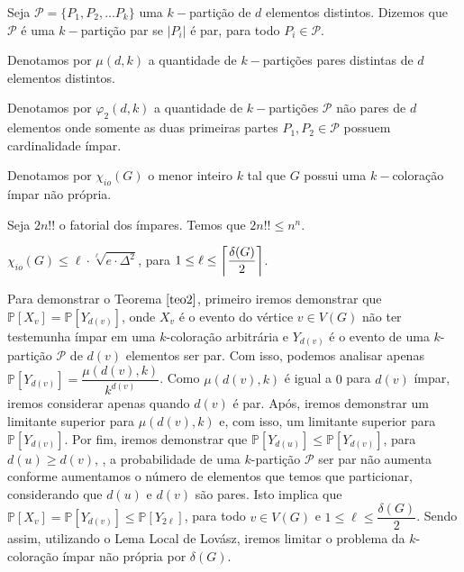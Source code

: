 \documentclass[12pt]{article}
\begin{document}

{
 
\begin{defi}
	\label{defi1}
	Seja $\mathcal{P} = \{P_1, P_2, \ldots P_k \}$ uma $k-$partição de $d$ elementos distintos. Dizemos que $\mathcal{P}$ é uma $k-$partição par se $|P_i|$ é par, para todo $P_i \in \mathcal{P}$.
\end{defi} \newbegin
 

\begin{defi}
	\label{defi2}
	Denotamos por $\mu(d, k)$ a quantidade de $k-$partições pares distintas de $d$ elementos distintos.
\end{defi} \newbegin

\begin{defi}
	\label{def4}
	Denotamos por $\varphi_2(d, k)$ a quantidade de $k-$partições $\mathcal{P}$ não pares de $d$ elementos onde somente as duas primeiras partes $P_1, P_2 \in \mathcal{P}$ possuem cardinalidade ímpar. 
\end{defi} \newbegin

\begin{defi}
	\label{def5}
	Denotamos por $\chi_{io}(G)$ o menor inteiro $k$ tal que  $G$ possui uma $k-$coloração ímpar não própria. 
\end{defi} \newbegin

\begin{prop}
	\label{prop3}
	Seja $2n!!$ o fatorial dos ímpares. Temos que $2n!! \leq n^n$.
\end{prop} \newbegin
 
\begin{teo}
	\label{teo2} 
	$\chi_{io}(G) \leq \ell {\cdot} \sqrt[\ell]{e {\cdot} \Delta^2}$, para $1 \leq \ell \leq \left \lceil \dfrac{\delta(G)}{2} \right \rceil$. 
\end{teo}   

 Para demonstrar o Teorema $\ref{teo2}$, primeiro iremos demonstrar que $\mathds{P}[X_v] = \mathds{P}[Y_{d(v)}]$, onde $X_v$ é o evento do vértice $v \in V(G)$ não ter testemunha ímpar em uma $k$-coloração arbitrária e $Y_{d(v)}$ é o evento de uma $k$-partição $\mathcal{P}$ de $d(v)$ elementos ser par. Com isso, podemos analisar apenas $\mathds{P}[Y_{d(v)}] = \dfrac{\mu(d(v), k)}{k^{d(v)}}$. Como $\mu(d(v), k)$ é igual a $0$ para $d(v)$ ímpar, iremos considerar apenas quando $d(v)$ é par. Após, iremos demonstrar um limitante superior para $\mu(d(v), k)$ e, com isso, um limitante superior para $\mathds{P}[Y_{d(v)}]$. Por fim, iremos demonstrar que $\mathds{P}[Y_{d(u)}] \leq \mathds{P}[Y_{d(v)}]$, para $d(u) \geq d(v)$, \ie, a probabilidade de uma $k$-partição $\mathcal{P}$ ser par não aumenta conforme aumentamos o número de elementos que temos que particionar, considerando que $d(u)$ e $d(v)$ são pares. Isto implica que $\mathds{P}[X_v] = \mathds{P}[Y_{d(v)}] \leq \mathds{P}[Y_{2\ell}]$, para todo $v \in V(G)$ e $1 \leq \ell \leq \dfrac{\delta(G)}{2}$. Sendo assim, utilizando o Lema Local de Lovász, iremos limitar o problema da $k$-coloração ímpar não própria por $\delta(G)$.  \newpage 
 
}
\end{document}
